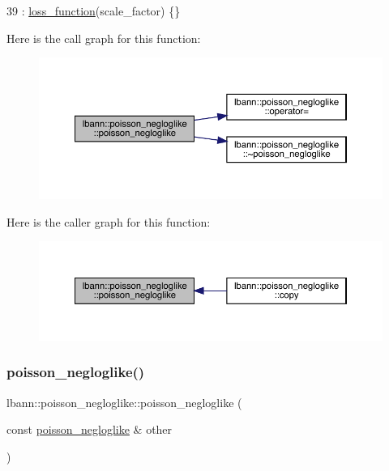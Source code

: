 \begin{DoxyCode}
39     : \hyperlink{classlbann_1_1loss__function_a0c5745e661c59e3e5496888d233c07cf}{loss\_function}(scale\_factor) \{\}
\end{DoxyCode}
Here is the call graph for this function\+:\nopagebreak
\begin{figure}[H]
\begin{center}
\leavevmode
\includegraphics[width=350pt]{classlbann_1_1poisson__negloglike_af2eabe95046d8995263a2df9e8e34f7d_cgraph}
\end{center}
\end{figure}
Here is the caller graph for this function\+:\nopagebreak
\begin{figure}[H]
\begin{center}
\leavevmode
\includegraphics[width=350pt]{classlbann_1_1poisson__negloglike_af2eabe95046d8995263a2df9e8e34f7d_icgraph}
\end{center}
\end{figure}
\mbox{\label{classlbann_1_1poisson__negloglike_a0d85fa77a2dc622524726584619e718a}} 
\subsubsection{\texorpdfstring{poisson\+\_\+negloglike()}{poisson\_negloglike()}\hspace{0.1cm}{\footnotesize\ttfamily [2/2]}}
{\footnotesize\ttfamily lbann\+::poisson\+\_\+negloglike\+::poisson\+\_\+negloglike (\begin{DoxyParamCaption}\item[{const \hyperlink{classlbann_1_1poisson__negloglike}{poisson\+\_\+negloglike} \&}]{other }\end{DoxyParamCaption})\hspace{0.3cm}{\ttfamily [default]}}

